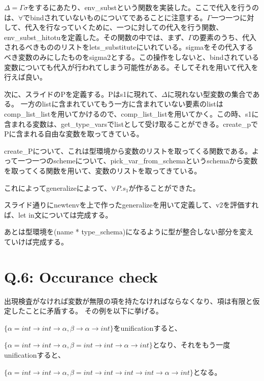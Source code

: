 \documentclass[uplatex,12pt]{jsarticle}
\begin{document}
$\Delta = \Gamma \sigma $をするにあたり、env\_substという関数を実装した。ここで代入を行うのは、$\forall$でbindされていないものについてであることに注意する。$\Gamma$一つ一つに対して、代入を行なっていくために、一つに対しての代入を行う関数、env\_subst\_hitotuを定義した。その関数の中では、まず、$\Gamma$の要素のうち、代入されるべきもののリストをlets\_substituteにいれている。sigmaをその代入するべき変数のみにしたものをsigma2とする。この操作をしないと、bindされている変数についても代入が行われてしまう可能性がある。そしてそれを用いて代入を行えば良い。

\vspace{12pt}

次に、スライドのPを定義する。Pはs1に現れて、$\Delta$に現れない型変数の集合である。
一方のlistに含まれていてもう一方に含まれていない要素のlistはcomp\_list\_listを用いてかけるので、comp\_list\_listを用いてかく。この時、s1に含まれる変数は、get\_type\_varsでlistとして受け取ることができる。create\_pでPに含まれる自由な変数を取ってきている。

create\_Pについて、これは型環境から変数のリストを取ってくる関数である。よって一つ一つのschemeについて、pick\_var\_from\_schemaというschemaから変数を取ってくる関数を用いて、変数のリストを取ってきている。

これによってgeneralizeによって、$\forall P. s_1$が作ることができた。

スライド通りにnewtenvを上で作ったgeneralizeを用いて定義して、v2を評価すれば、let in文については完成する。

\vspace{12pt}

あとは型環境を(name * type\_schema)になるように型が整合しない部分を変えていけば完成する。

\section{Q.6: Occurance check}
出現検査がなければ変数が無限の項を持たなければならなくなり、項は有限と仮定したことに矛盾する。
その例を以下に挙げる。

$\{\alpha = int \rightarrow int \rightarrow \alpha, \beta \rightarrow \alpha \rightarrow int\}$をunificationすると、

$\{\alpha = int \rightarrow int \rightarrow \alpha, \beta = int \rightarrow int \rightarrow \alpha \rightarrow int \}$となり、それをもう一度unificationすると、

$\{\alpha = int \rightarrow int \rightarrow \alpha, \beta = int \rightarrow int \rightarrow int \rightarrow int \rightarrow \alpha \rightarrow int \}$となる。
\end{document}
